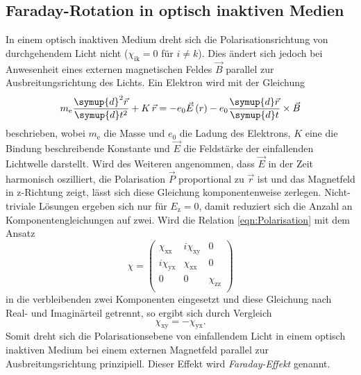 \subsection{Faraday-Rotation in optisch inaktiven Medien}
\label{sec:Theo22}

In einem optisch inaktiven Medium dreht sich die Polarisationsrichtung von
durchgehendem Licht nicht ($\chi_\text{ik} = 0$ für $i \neq k$).
Dies ändert sich jedoch bei Anwesenheit eines externen magnetischen Feldes $\vec{B}$
parallel zur Ausbreitungsrichtung des Lichts.
Ein Elektron wird mit der Gleichung
\begin{equation*}
  m_\text{e} \frac{\symup{d}^2 \vec{r}}{\symup{d} t^2} + K \, \vec{r} =
  - e_0 \vec{E}\left(r\right)
  - e_0 \frac{\symup{d} \vec{r}}{\symup{d} t} \times \vec{B}
\end{equation*}
beschrieben, wobei $m_\text{e}$ die Masse und $e_0$ die Ladung des Elektrons,
$K$ eine die Bindung beschreibende Konstante und
$\vec{E}$ die Feldstärke der einfallenden Lichtwelle darstellt.
Wird des Weiteren angenommen, dass $\vec{E}$ in der Zeit harmonisch
oszilliert, die Polarisation $\vec{P}$ proportional zu $\vec{r}$ ist
und das Magnetfeld in z-Richtung zeigt, lässt sich diese Gleichung
komponentenweise zerlegen.
Nicht-triviale Lösungen ergeben sich nur für $E_\text{z} = 0$,
damit reduziert sich die Anzahl an Komponentengleichungen auf zwei.
Wird die Relation \eqref{eqn:Polarisation} mit dem Ansatz
\begin{equation*}
  \chi =
  \begin{pmatrix}
    \chi_\text{xx} & i \chi_\text{xy} & 0 \\
    i \chi_\text{yx} & \chi_\text{xx} & 0 \\
    0 & 0 & \chi_\text{zz} \\
  \end{pmatrix}
\end{equation*}
in die verbleibenden zwei Komponenten eingesetzt und diese Gleichung
nach Real- und Imaginärteil getrennt, so ergibt sich durch Vergleich
\begin{equation*}
  \chi_\text{xy} = - \chi_\text{yx}.
\end{equation*}
Somit dreht sich die Polarisationsebene von einfallendem Licht in einem
optisch inaktiven Medium bei einem externen Magnetfeld parallel zur
Ausbreitungsrichtung prinzipiell.
Dieser Effekt wird \emph{Faraday-Effekt} genannt.

